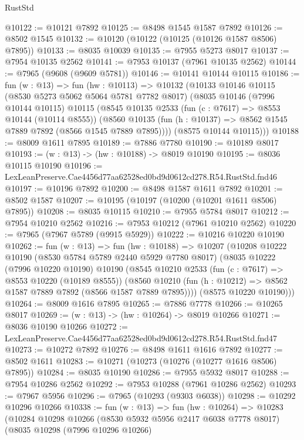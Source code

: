 \begin{lexlean}{RustStd}
\begin{coremodule}
@10122 := @10121 @7892
@10125 := @8498 @1545 @1587 @7892
@10126 := @8502 @1545
@10132 := @10120 (@10122 (@10125 (@10126 @1587 @8506) @7895))
@10133 := @8035 @10039
@10135 := @7955 @5273 @8017
@10137 := @7954 @10135 @2562
@10141 := @7953 @10137 (@7961 @10135 @2562)
@10144 := @7965 (@9608 (@9609 @5781))
@10146 := @10141 @10144 @10115
@10186 := fun (w : @13) =>
  fun (hw : @10113) =>
  @10132
    (@10133
      @10146
      @10115
      (@8530 @5273 @5062 @5064 @5781 @7782 @8017)
      (@8035
        @10146
        (@7996 @10144 @10115)
        @10115
        (@8545
          @10135
          @2533
          (fun (c : @7617) => @8553 @10144 (@10114 @8555))
          (@8560 @10135 (fun (h : @10137) => @8562 @1545 @7889 @7892 (@8566 @1545 @7889 @7895))))
        (@8575 @10144 @10115)))
@10188 := @8009 @1611 @7895
@10189 := @7886 @7780
@10190 := @10189 @8017
@10193 := (w : @13) -> (hw : @10188) -> @8019 @10190
@10195 := @8036 @10115 @10190
@10196 := LexLeanPreserve.Cae4456d77aa62528ed0bd9d0612cd278.R54.RustStd.fnd46
@10197 := @10196 @7892
@10200 := @8498 @1587 @1611 @7892
@10201 := @8502 @1587
@10207 := @10195 (@10197 (@10200 (@10201 @1611 @8506) @7895))
@10208 := @8035 @10115
@10210 := @7955 @5784 @8017
@10212 := @7954 @10210 @2562
@10216 := @7953 @10212 (@7961 @10210 @2562)
@10220 := @7965 (@7967 @5789 (@9915 @5929))
@10222 := @10216 @10220 @10190
@10262 := fun (w : @13) =>
  fun (hw : @10188) =>
  @10207
    (@10208
      @10222
      @10190
      (@8530 @5784 @5789 @2440 @5929 @7780 @8017)
      (@8035
        @10222
        (@7996 @10220 @10190)
        @10190
        (@8545
          @10210
          @2533
          (fun (c : @7617) => @8553 @10220 (@10189 @8555))
          (@8560 @10210 (fun (h : @10212) => @8562 @1587 @7889 @7892 (@8566 @1587 @7889 @7895))))
        (@8575 @10220 @10190)))
@10264 := @8009 @1616 @7895
@10265 := @7886 @7778
@10266 := @10265 @8017
@10269 := (w : @13) -> (hw : @10264) -> @8019 @10266
@10271 := @8036 @10190 @10266
@10272 := LexLeanPreserve.Cae4456d77aa62528ed0bd9d0612cd278.R54.RustStd.fnd47
@10273 := @10272 @7892
@10276 := @8498 @1611 @1616 @7892
@10277 := @8502 @1611
@10283 := @10271 (@10273 (@10276 (@10277 @1616 @8506) @7895))
@10284 := @8035 @10190
@10286 := @7955 @5932 @8017
@10288 := @7954 @10286 @2562
@10292 := @7953 @10288 (@7961 @10286 @2562)
@10293 := @7967 @5956
@10296 := @7965 (@10293 (@9303 @6038))
@10298 := @10292 @10296 @10266
@10338 := fun (w : @13) =>
  fun (hw : @10264) =>
  @10283
    (@10284
      @10298
      @10266
      (@8530 @5932 @5956 @2417 @6038 @7778 @8017)
      (@8035
        @10298
        (@7996 @10296 @10266)

\end{coremodule}
\end{lexlean}
